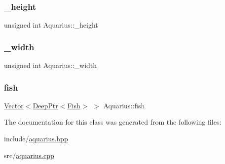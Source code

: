 \subsubsection{\texorpdfstring{\+\_\+height}{\_height}}
{\footnotesize\ttfamily unsigned int Aquarius\+::\+\_\+height\hspace{0.3cm}{\ttfamily [private]}}

\mbox{\label{classAquarius_a0ca48db776444e3513c0927127228dad_a0ca48db776444e3513c0927127228dad}} 
\subsubsection{\texorpdfstring{\+\_\+width}{\_width}}
{\footnotesize\ttfamily unsigned int Aquarius\+::\+\_\+width\hspace{0.3cm}{\ttfamily [private]}}

\mbox{\label{classAquarius_ad4c9e6cdbe69fbdc96cf8be68d1b9e82_ad4c9e6cdbe69fbdc96cf8be68d1b9e82}} 
\subsubsection{\texorpdfstring{fish}{fish}}
{\footnotesize\ttfamily \hyperlink{classVector}{Vector}$<$\hyperlink{classDeepPtr}{Deep\+Ptr}$<$\hyperlink{classFish}{Fish}$>$ $>$ Aquarius\+::fish\hspace{0.3cm}{\ttfamily [private]}}



The documentation for this class was generated from the following files\+:\begin{DoxyCompactItemize}
\item 
include/\hyperlink{aquarius_8hpp}{aquarius.\+hpp}\item 
src/\hyperlink{aquarius_8cpp}{aquarius.\+cpp}\end{DoxyCompactItemize}
